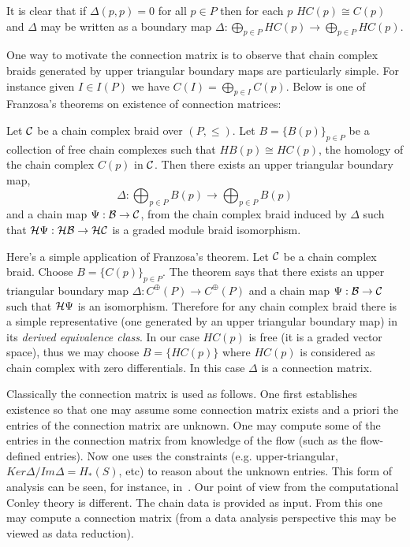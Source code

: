 It is clear that if $\Delta(p,p)=0$ for all $p\in P$ then for each $p$ $HC(p)\cong C(p)$ and $\Delta$ may be written as a boundary map $\Delta:\bigoplus_{p\in P} HC(p)\to \bigoplus_{p\in P} HC(p)$.

One way to motivate the connection matrix is to observe that chain complex braids generated by upper triangular boundary maps are particularly simple.  For instance given $I\in I(P)$ we have $C(I) = \bigoplus_{p\in I} C(p)$.  Below is one of Franzosa's theorems on existence of connection matrices:

\begin{thm}
Let ${\mathcal C}$ be a chain complex braid over $(P,\leq)$.  Let $B=\{B(p)\}_{p\in P}$ be a collection of free chain complexes such that $HB(p) \cong HC(p)$, the homology of the chain complex $C(p)$ in ${\mathcal C}$.  Then there exists an upper triangular boundary map, $$\Delta:\bigoplus_{p\in P} B(p)\to \bigoplus_{p\in P}B(p)$$ and a chain map $\Psi:{\mathcal B}\to {\mathcal C}$, from the chain complex braid induced by $\Delta$ such that ${\mathcal H}\Psi:{\mathcal H}{\mathcal B}\to {\mathcal H}{\mathcal C}$ is a graded module braid isomorphism.
\end{thm}

Here's a simple application of Franzosa's theorem.  Let ${\mathcal C}$ be a chain complex braid.  Choose $B = \{C(p)\}_{p\in P}$.  The theorem says that there exists an upper triangular boundary map $\Delta:C^\oplus(P)\to C^\oplus(P)$ and a chain map $\Psi:{\mathcal B}\to {\mathcal C}$ such that ${\mathcal H}\Psi$ is an isomorphism.  Therefore for any chain complex braid there is a simple representative (one generated by an upper triangular boundary map) in its {\em derived equivalence class}.  In our case $HC(p)$ is free (it is a graded vector space), thus we may choose $B=\{HC(p)\}$ where $HC(p)$ is considered as chain complex with zero differentials.  In this case $\Delta$ is a connection matrix.


\begin{rem}
Classically the connection matrix is used as follows.  One first establishes existence so that one may assume some connection matrix exists and a priori the entries of the connection matrix are unknown.  One may compute some of the entries in the connection matrix from knowledge of the flow (such as the flow-defined entries).  Now one uses the constraints (e.g. upper-triangular, $Ker\Delta/Im\Delta = H_*(S)$, etc) to reason about the unknown entries.  This form of analysis can be seen, for instance, in~\cite{}.  Our point of view from the computational Conley theory is different.  The chain data is provided as input.  From this one may compute a connection matrix (from a data analysis perspective this may be viewed as data reduction). 
\end{rem}






